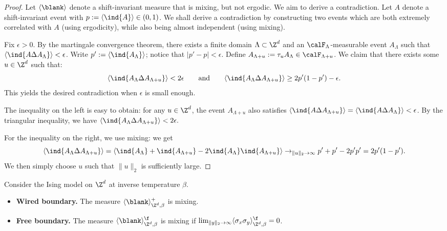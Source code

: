 \begin{proof}
    Let $\langle\blank\rangle$ denote a shift-invariant measure that is mixing, but not ergodic.
    We aim to derive a contradiction.
    Let $A$ denote a shift-invariant event with $p:=\langle\ind{A}\rangle\in(0,1)$.
    We shall derive a contradiction by constructing two events which
    are both extremely correlated with $A$ (using ergodicity),
    while also being almost independent (using mixing).

    Fix $\epsilon>0$.
    By the martingale convergence theorem,
    there exists a finite domain $\Lambda\subset\Z^d$
    and an $\calF_\Lambda$-measurable event
    $A_\Lambda$
    such that
    $\langle \ind{A\Delta A_\Lambda}\rangle<\epsilon$.
    Write $p':=\langle \ind{A_\Lambda}\rangle$;
    notice that $|p'-p|<\epsilon$.
    Define $A_{\Lambda+u}:=\tau_uA_\Lambda\in\calF_{\Lambda+u}$.
    We claim that there exists some $u\in\Z^d$ such that:
    \[
        \langle \ind{A_\Lambda\Delta A_{\Lambda+u}}\rangle
        <2\epsilon
        \qquad
        \text{and}
        \qquad
        \langle \ind{A_\Lambda\Delta A_{\Lambda+u}}\rangle
        \geq 2p'(1-p')-\epsilon.
    \]
    This yields the desired contradiction when $\epsilon$ is small enough.

    The inequality on the left is easy to obtain:
    for any $u\in\Z^d$,
    the event $A_{\Lambda+u}$
    also satisfies
    $\langle \ind{A\Delta A_{\Lambda+u}}\rangle=\langle \ind{A\Delta A_\Lambda}\rangle<\epsilon$.
    By the triangular inequality, we have
    \(
        \langle \ind{A_\Lambda\Delta A_{\Lambda+u}}\rangle
        <2\epsilon.
    \)

    For the inequality on the right, we use mixing:
    we get
    \[
        \langle \ind{A_\Lambda\Delta A_{\Lambda+u}}\rangle
        =
        \langle \ind{A_\Lambda}+\ind{A_{\Lambda+u}}
        -
        2 \ind{A_\Lambda}\ind{A_{\Lambda+u}}\rangle
        \to_{\|u\|_2\to\infty}
        p'+p'-2p'p'
        =2p'(1-p').
    \]
    We then simply choose $u$ such that $\|u\|_2$ is sufficiently large.
\end{proof}

\begin{theorem}
    Consider the Ising model on $\Z^d$ at inverse temperature $\beta$.
    \begin{itemize}
        \item \textbf{Wired boundary.}
            The measure $\langle\blank\rangle_{\Z^d,\beta}^+$ is mixing.
        \item \textbf{Free boundary.}
            The measure $\langle\blank\rangle_{\Z^d,\beta}^\f$ is mixing if
            $\lim_{\|y\|_2\to\infty}\langle\sigma_x\sigma_y\rangle_{\Z^d,\beta}^\f=0$.
    \end{itemize}
\end{theorem}

